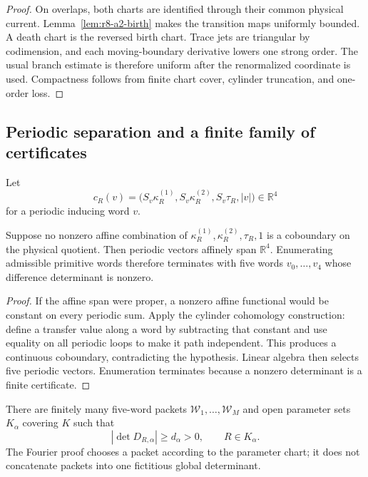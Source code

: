 \begin{proof}
On overlaps, both charts are identified through their common physical current.
Lemma~\ref{lem:r8-a2-birth} makes the transition maps uniformly bounded.  A
death chart is the reversed birth chart.  Trace jets are triangular by
codimension, and each moving-boundary derivative lowers one strong order.  The
usual branch estimate is therefore uniform after the renormalized coordinate
is used.  Compactness follows from finite chart cover, cylinder truncation,
and one-order loss.
\end{proof}

\subsection{Periodic separation and a finite family of certificates}

Let
\[
 c_R(v)=\bigl(S_v\kappa_R^{(1)},S_v\kappa_R^{(2)},S_v\tau_R,|v|\bigr)
 \in\mathbb R^4
\]
for a periodic inducing word $v$.

\begin{lemma}
\label{lem:r8-a2-span}
Suppose no nonzero affine combination of
$\kappa_R^{(1)},\kappa_R^{(2)},\tau_R,1$ is a coboundary on the physical
quotient.  Then periodic vectors affinely span $\mathbb R^4$.  Enumerating
admissible primitive words therefore terminates with five words
$v_0,\ldots,v_4$ whose difference determinant is nonzero.
\end{lemma}

\begin{proof}
If the affine span were proper, a nonzero affine functional would be constant
on every periodic sum.  Apply the cylinder cohomology construction: define a
transfer value along a word by subtracting that constant and use equality on
all periodic loops to make it path independent.  This produces a continuous
coboundary, contradicting the hypothesis.  Linear algebra then selects five
periodic vectors.  Enumeration terminates because a nonzero determinant is a
finite certificate.
\end{proof}

\begin{theorem}
\label{thm:r8-a2-certificates}
There are finitely many five-word packets $\mathcal W_1,\ldots,\mathcal W_M$
and open parameter sets $K_\alpha$ covering $K$ such that
\[
 |\det D_{R,\alpha}|\ge d_\alpha>0,
 \qquad R\in K_\alpha.
\]
The Fourier proof chooses a packet according to the parameter chart; it does
not concatenate packets into one fictitious global determinant.
\end{theorem}


